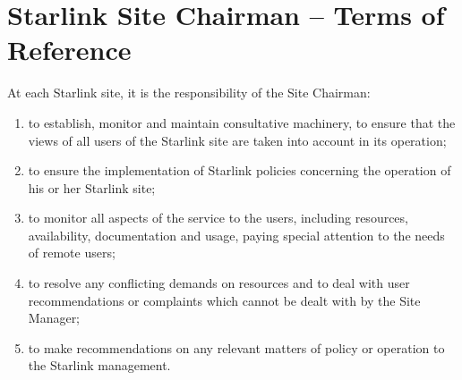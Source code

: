 \appendix
\section{Starlink Site Chairman -- Terms of Reference}

At each Starlink site, it is the responsibility of the Site Chairman:
\begin{enumerate}
\item to establish, monitor and maintain consultative machinery,
      to ensure that the views of all users of the Starlink site
      are taken into account in its operation;
\item to ensure the implementation of Starlink policies concerning the
      operation of his or her Starlink site;
\item to monitor all aspects of the service to the users, including
      resources, availability, documentation and usage, paying special
      attention to the needs of remote users;
\item to resolve any conflicting demands on resources and to deal with
      user recommendations or complaints which cannot be dealt with by the
      Site Manager;
\item to make recommendations on any relevant matters of policy or
      operation to the Starlink management.
\end{enumerate}

